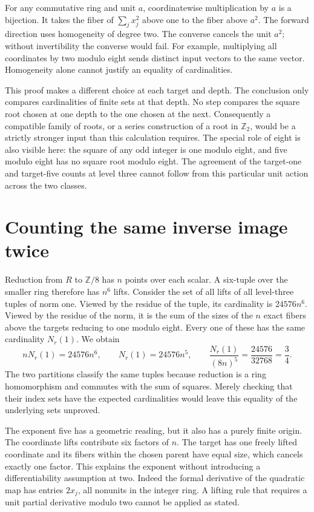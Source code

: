 \documentclass[12pt,letterpaper]{article}
\begin{document}
For any commutative ring and unit $a$, coordinatewise multiplication by $a$ is a bijection. It takes the fiber of $\sum_jx_j^2$ above one to the fiber above $a^2$. The forward direction uses homogeneity of degree two. The converse cancels the unit $a^2$; without invertibility the converse would fail. For example, multiplying all coordinates by two modulo eight sends distinct input vectors to the same vector. Homogeneity alone cannot justify an equality of cardinalities.

This proof makes a different choice at each target and depth. The conclusion only compares cardinalities of finite sets at that depth. No step compares the square root chosen at one depth to the one chosen at the next. Consequently a compatible family of roots, or a series construction of a root in $\mathbb Z_2$, would be a strictly stronger input than this calculation requires. The special role of eight is also visible here: the square of any odd integer is one modulo eight, and five modulo eight has no square root modulo eight. The agreement of the target-one and target-five counts at level three cannot follow from this particular unit action across the two classes.
\section{Counting the same inverse image twice}
Reduction from $R$ to $\mathbb Z/8$ has $n$ points over each scalar. A six-tuple over the smaller ring therefore has $n^6$ lifts. Consider the set of all lifts of all level-three tuples of norm one. Viewed by the residue of the tuple, its cardinality is $24576n^6$. Viewed by the residue of the norm, it is the sum of the sizes of the $n$ exact fibers above the targets reducing to one modulo eight. Every one of these has the same cardinality $N_r(1)$. We obtain
\[
 nN_r(1)=24576n^6,\qquad
 N_r(1)=24576n^5,\qquad
 \frac{N_r(1)}{(8n)^5}=\frac{24576}{32768}=\frac34.
\]
The two partitions classify the same tuples because reduction is a ring homomorphism and commutes with the sum of squares. Merely checking that their index sets have the expected cardinalities would leave this equality of the underlying sets unproved.

The exponent five has a geometric reading, but it also has a purely finite origin. The coordinate lifts contribute six factors of $n$. The target has one freely lifted coordinate and its fibers within the chosen parent have equal size, which cancels exactly one factor. This explains the exponent without introducing a differentiability assumption at two. Indeed the formal derivative of the quadratic map has entries $2x_j$, all nonunits in the integer ring. A lifting rule that requires a unit partial derivative modulo two cannot be applied as stated.
\end{document}
